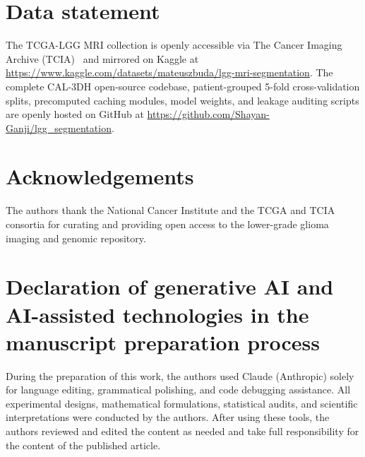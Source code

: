 \documentclass[preprint,12pt,authoryear]{elsarticle}
\begin{document}
\section*{Data statement}
The TCGA-LGG MRI collection is openly accessible via The Cancer Imaging Archive (TCIA)~\citep{clark2013cancer,tcgalgg2019data} and mirrored on Kaggle at \url{https://www.kaggle.com/datasets/mateuszbuda/lgg-mri-segmentation}. The complete CAL-3DH open-source codebase, patient-grouped 5-fold cross-validation splits, precomputed caching modules, model weights, and leakage auditing scripts are openly hosted on GitHub at \url{https://github.com/Shayan-Ganji/lgg_segmentation}.

\section*{Acknowledgements}
The authors thank the National Cancer Institute and the TCGA and TCIA consortia for curating and providing open access to the lower-grade glioma imaging and genomic repository.

\section*{Declaration of generative AI and AI-assisted technologies in the manuscript preparation process}
During the preparation of this work, the authors used Claude (Anthropic) solely for language editing, grammatical polishing, and code debugging assistance. All experimental designs, mathematical formulations, statistical audits, and scientific interpretations were conducted by the authors. After using these tools, the authors reviewed and edited the content as needed and take full responsibility for the content of the published article.
\end{document}
